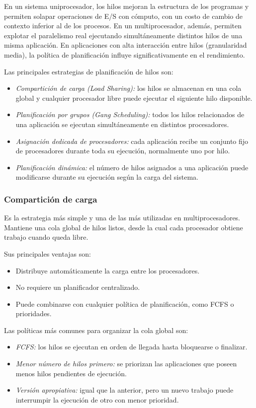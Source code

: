 En un sistema uniprocesador, los hilos mejoran la estructura de los programas y permiten solapar operaciones de E/S con cómputo, con un costo de cambio de contexto inferior al de los procesos. En un multiprocesador, además, permiten explotar el paralelismo real ejecutando simultáneamente distintos hilos de una misma aplicación. En aplicaciones con alta interacción entre hilos (granularidad media), la política de planificación influye significativamente en el rendimiento.

Las principales estrategias de planificación de hilos son:
\begin{itemize}
  \item \textit{Compartición de carga (\textit{Load Sharing}):} los hilos se almacenan en una cola global y cualquier procesador libre puede ejecutar el siguiente hilo disponible.
  \item \textit{Planificación por grupos (\textit{Gang Scheduling}):} todos los hilos relacionados de una aplicación se ejecutan simultáneamente en distintos procesadores.
  \item \textit{Asignación dedicada de procesadores:} cada aplicación recibe un conjunto fijo de procesadores durante toda su ejecución, normalmente uno por hilo.
  \item \textit{Planificación dinámica:} el número de hilos asignados a una aplicación puede modificarse durante su ejecución según la carga del sistema.
\end{itemize}

\subsubsection{Compartición de carga}

Es la estrategia más simple y una de las más utilizadas en multiprocesadores. Mantiene una cola global de hilos listos, desde la cual cada procesador obtiene trabajo cuando queda libre.

Sus principales ventajas son:
\begin{itemize}
  \item Distribuye automáticamente la carga entre los procesadores.
  \item No requiere un planificador centralizado.
  \item Puede combinarse con cualquier política de planificación, como FCFS o prioridades.
\end{itemize}
Las políticas más comunes para organizar la cola global son:
\begin{itemize}
  \item \textit{FCFS:} los hilos se ejecutan en orden de llegada hasta bloquearse o finalizar.
  \item \textit{Menor número de hilos primero:} se priorizan las aplicaciones que poseen menos hilos pendientes de ejecución.
  \item \textit{Versión apropiativa:} igual que la anterior, pero un nuevo trabajo puede interrumpir la ejecución de otro con menor prioridad.
\end{itemize}

